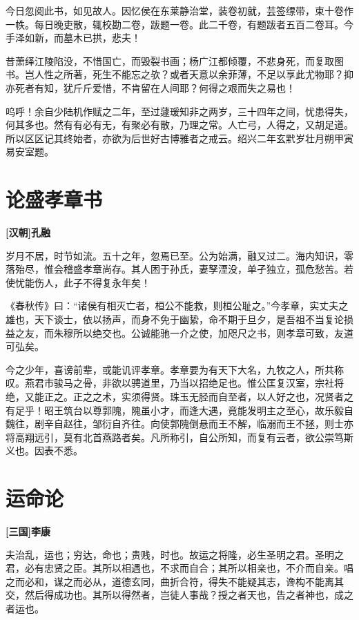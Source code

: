 \documentclass[UTF8,titlepage,oneside]{ctexbook}
\begin{document}
今日忽阅此书，如见故人。因忆侯在东莱静治堂，装卷初就，芸签缥带，束十卷作一帙。每日晚吏散，辄校勘二卷，跋题一卷。此二千卷，有题跋者五百二卷耳。今手泽如新，而墓木已拱，悲夫！


昔萧绎江陵陷没，不惜国亡，而毁裂书画；杨广江都倾覆，不悲身死，而复取图书。岂人性之所著，死生不能忘之欤？或者天意以余菲薄，不足以享此尤物耶？抑亦死者有知，犹斤斤爱惜，不肯留在人间耶？何得之艰而失之易也！


呜呼！余自少陆机作赋之二年，至过蘧瑗知非之两岁，三十四年之间，忧患得失，何其多也。然有有必有无，有聚必有散，乃理之常。人亡弓，人得之，又胡足道。所以区区记其终始者，亦欲为后世好古博雅者之戒云。绍兴二年玄黓岁壮月朔甲寅易安室题。



\chapter*{论盛孝章书}
\begin{center}
	\textbf{[汉朝]孔融}
\end{center}

岁月不居，时节如流。五十之年，忽焉已至。公为始满，融又过二。海内知识，零落殆尽，惟会稽盛孝章尚存。其人困于孙氏，妻孥湮没，单孑独立，孤危愁苦。若使忧能伤人，此子不得复永年矣！

《春秋传》曰：“诸侯有相灭亡者，桓公不能救，则桓公耻之。”今孝章，实丈夫之雄也，天下谈士，依以扬声，而身不免于幽絷，命不期于旦夕，是吾祖不当复论损益之友，而朱穆所以绝交也。公诚能驰一介之使，加咫尺之书，则孝章可致，友道可弘矣。

今之少年，喜谤前辈，或能讥评孝章。孝章要为有天下大名，九牧之人，所共称叹。燕君市骏马之骨，非欲以骋道里，乃当以招绝足也。惟公匡复汉室，宗社将绝，又能正之。正之之术，实须得贤。珠玉无胫而自至者，以人好之也，况贤者之有足乎！昭王筑台以尊郭隗，隗虽小才，而逢大遇，竟能发明主之至心，故乐毅自魏往，剧辛自赵往，邹衍自齐往。向使郭隗倒悬而王不解，临溺而王不拯，则士亦将高翔远引，莫有北首燕路者矣。凡所称引，自公所知，而复有云者，欲公崇笃斯义也。因表不悉。


\chapter*{运命论}
\begin{center}
	\textbf{[三国]李康}
\end{center}

夫治乱，运也；穷达，命也；贵贱，时也。故运之将隆，必生圣明之君。圣明之君，必有忠贤之臣。其所以相遇也，不求而自合；其所以相亲也，不介而自亲。唱之而必和，谋之而必从，道德玄同，曲折合符，得失不能疑其志，谗构不能离其交，然后得成功也。其所以得然者，岂徒人事哉？授之者天也，告之者神也，成之者运也。
\end{document}
